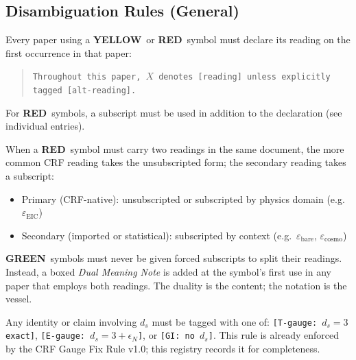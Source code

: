 \documentclass[12pt, a4paper]{article}
\newcommand{\TRED}{\textcolor{redframe}{\textbf{RED}}}
\newcommand{\TYELLOW}{\textcolor{yellowframe}{\textbf{YELLOW}}}
\newcommand{\TGREEN}{\textcolor{greenframe}{\textbf{GREEN}}}
\begin{document}
\subsection{Disambiguation Rules (General)}

\begin{rulebox}[title={RULE-01: First-Use Declaration}]
Every paper using a \TYELLOW\ or \TRED\ symbol must declare its
reading on the first occurrence in that paper:
\begin{quote}
\texttt{Throughout this paper, $X$ denotes [reading] unless
explicitly tagged [alt-reading].}
\end{quote}
For \TRED\ symbols, a subscript must be used in addition to the
declaration (see individual entries).
\end{rulebox}

\begin{rulebox}[title={RULE-02: Subscript Hierarchy for RED Symbols}]
When a \TRED\ symbol must carry two readings in the same document,
the more common CRF reading takes the unsubscripted form; the
secondary reading takes a subscript:
\begin{itemize}[leftmargin=*, noitemsep]
  \item Primary (CRF-native): unsubscripted or subscripted by
    physics domain (e.g.\ $\varepsilon_{\text{EIC}}$)
  \item Secondary (imported or statistical): subscripted by
    context (e.g.\ $\varepsilon_{\text{bare}}$,
    $\varepsilon_{\text{cosmo}}$)
\end{itemize}
\end{rulebox}

\begin{rulebox}[title={RULE-03: GREEN Symbols — Document, Do Not Split}]
\TGREEN\ symbols must never be given forced subscripts to split
their readings. Instead, a boxed \emph{Dual Meaning Note} is added
at the symbol's first use in any paper that employs both readings.
The duality is the content; the notation is the vessel.
\end{rulebox}

\begin{rulebox}[title={RULE-04: Gauge Tagging for $d_s$}]
Any identity or claim involving $d_s$ must be tagged with one of:
\texttt{[T-gauge: $d_s=3$ exact]},
\texttt{[E-gauge: $d_s=3+\epsilon_N$]},
or \texttt{[GI: no $d_s$]}.
This rule is already enforced by the CRF Gauge Fix Rule v1.0;
this registry records it for completeness.
\end{rulebox}
\end{document}

